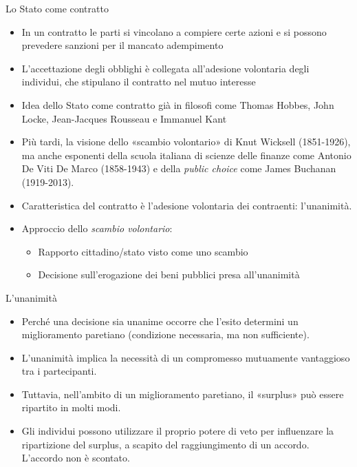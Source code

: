 \documentclass[11pt]{beamer}
\begin{document}
\begin{frame}{Lo Stato come contratto}
\begin{itemize}
\item In un contratto le parti si vincolano a compiere certe azioni e si possono
prevedere sanzioni per il mancato adempimento
\item L'accettazione degli obblighi è collegata all'adesione volontaria degli
individui, che stipulano il contratto nel mutuo interesse
\item Idea dello Stato come contratto già in filosofi come Thomas Hobbes, John
Locke, Jean-Jacques Rousseau e Immanuel Kant
\item Più tardi, la visione dello «scambio volontario» di Knut Wicksell
(1851-1926), ma anche esponenti della scuola italiana di scienze delle
finanze come Antonio De Viti De Marco (1858-1943) e della \emph{public choice}
come James Buchanan (1919-2013).
\item Caratteristica del contratto è l'adesione volontaria dei contraenti:
l'unanimità.
\item Approccio dello \emph{scambio volontario}:
\begin{itemize}
\item Rapporto cittadino/stato visto come uno scambio
\item Decisione sull'erogazione dei beni pubblici presa all'\alert{unanimità}
\end{itemize}
\end{itemize}
\end{frame}

\begin{frame}{L'unanimità}
\begin{itemize}
\item Perché una decisione sia unanime occorre che l'esito determini un
miglioramento paretiano (condizione necessaria, ma non sufficiente).
\item L'unanimità implica la necessità di un compromesso mutuamente vantaggioso
tra i partecipanti.
\item Tuttavia, nell'ambito di un miglioramento paretiano, il «surplus» può essere
ripartito in molti modi.
\item Gli individui possono utilizzare il proprio potere di veto per influenzare
la ripartizione del surplus, a scapito del raggiungimento di un
accordo. L'accordo non è scontato.
\end{itemize}
\end{frame}
\end{document}
